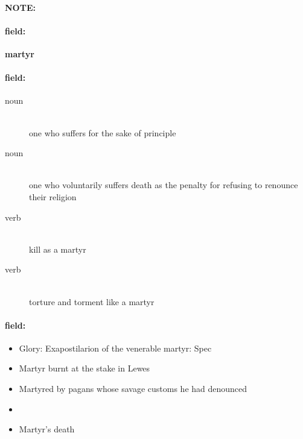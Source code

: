 \documentclass[12pt]{article}
\newenvironment{note}{\paragraph{NOTE:}}{}
\newenvironment{field}{\paragraph{field:}}{}
\begin{document}
\begin{note}
\begin{field}
\textbf{\large martyr}
\end{field}


\begin{field}
\begin{description}
\item[noun] \hfill \\ 
one who suffers for the sake of principle

\item[noun] \hfill \\ 
one who voluntarily suffers death as the penalty for refusing to renounce their religion

\item[verb] \hfill \\ 
kill as a martyr

\item[verb] \hfill \\ 
torture and torment like a martyr

\end{description}
\end{field}

\begin{field}
\begin{itemize}
\item Glory: Exapostilarion of the venerable martyr: Spec
\item Martyr burnt at the stake in Lewes
\item Martyred by pagans whose savage customs he had denounced
\item 
\item Martyr's death
\end{itemize}
\end{field}
\end{note}
\end{document}
